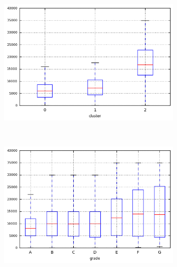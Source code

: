 \begin{anexosenv}
\begin{figure}[ht!]
\begin{subfigure}[t]{0.45\textwidth}
        \end{subfigure}
\end{figure}



\begin{figure}[ht!]
    \centering
                \caption{\emph{Boxplots} de total\textunderscore rec\textunderscore prncp }
        \begin{subfigure}[t]{0.45\textwidth}
            \centering

            \centerline{\includegraphics[width=1.05\textwidth]{img/total_rec_prncp_by_cluster}}
        \end{subfigure}%
        ~ 
        \begin{subfigure}[t]{0.45\textwidth}
            \centering
   
            \centerline{\includegraphics[width=1.05\textwidth]{img/total_rec_prncp_by_grade}}


\end{subfigure}
\end{figure}
\end{anexosenv}
